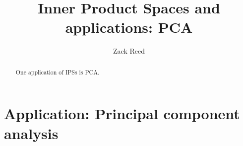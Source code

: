 \documentclass{ximera}
\author{Zack Reed}
\title{Inner Product Spaces and applications: PCA}
\begin{document}
\begin{abstract}

    One application of IPSs is PCA.

\end{abstract}
\maketitle


\section{Application: Principal component analysis}

\end{document}
